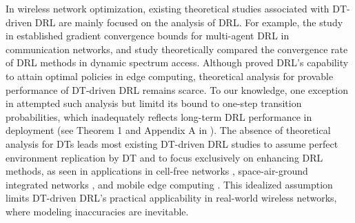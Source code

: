 In wireless network optimization, existing theoretical studies associated with DT-driven DRL are mainly focused on the analysis of DRL. For example, the study in \cite{10147312} established gradient convergence bounds for multi-agent DRL in communication networks, and study \cite{10623365} theoretically compared the convergence rate of DRL methods in dynamic spectrum access. Although \cite{10287987} proved DRL’s capability to attain optimal policies in edge computing, theoretical analysis for provable performance of DT-driven DRL remains scarce. To our knowledge, one exception in \cite{10522623} attempted such analysis but limitd its bound to one-step transition probabilities, which inadequately reflects long-term DRL performance in deployment (see Theorem 1 and Appendix A in \cite{10522623}). The absence of theoretical analysis for DTs leads most existing DT-driven DRL studies to assume perfect environment replication by DT and to focus exclusively on enhancing DRL methods, as seen in applications in cell-free networks \cite{10078846}, space-air-ground integrated networks \cite{10345669}, and mobile edge computing \cite{10235311}. This idealized assumption limits DT-driven DRL’s practical applicability in real-world wireless networks, where modeling inaccuracies are inevitable.
